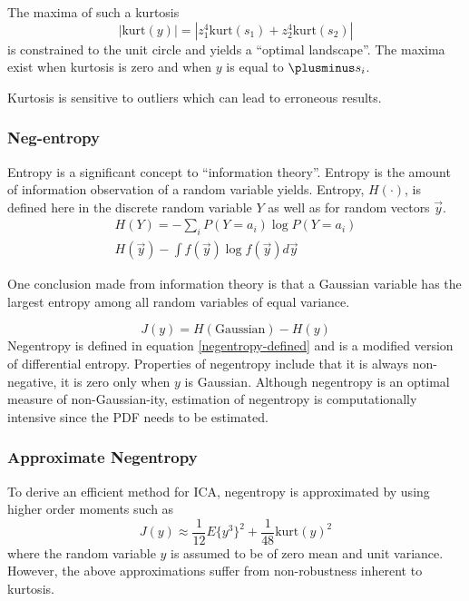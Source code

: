 \documentclass[]{article}
\begin{document}
The maxima of such a kurtosis
\begin{equation}
| \textrm{kurt}(y) | = |z_1 ^4 \textrm{kurt}(s_1) + z_2 ^4 \textrm{kurt}(s_2)|
\end{equation}
is constrained to the unit circle and yields a ``optimal landscape''.  The maxima exist when kurtosis is zero and when $y$ is equal to $\plusminus s_i$.  

Kurtosis is sensitive to outliers which can lead to erroneous results.  


\subsubsection{Neg-entropy}
Entropy is a significant concept to ``information theory''.  Entropy is the amount of information observation of a random variable yields.  Entropy, $H(\cdot)$, is defined here in the discrete random variable $Y$ as well as for random vectors $\vec{y}$.
\begin{eqnarray}
	H(Y) = - \sum _i P(Y = a_i) \log P(Y=a_i) \\
	H(\vec{y}) - \int f(\vec{y}) \log f(\vec{y}) d\vec{y}
\end{eqnarray}

One conclusion made from information theory is that a Gaussian variable has the largest entropy among all random variables of equal variance.  

\begin{equation}
J(y) = H ( \textrm{Gaussian}) - H(y) \label{negentropy-defined}
\end{equation}
Negentropy is defined in equation \ref{negentropy-defined} and   
is a modified version of differential entropy.  Properties of negentropy include that it is always non-negative, it is zero only when $y$ is Gaussian.  Although negentropy is an optimal measure of non-Gaussian-ity, estimation of negentropy is computationally intensive since the PDF needs to be estimated.  


\subsubsection{Approximate Negentropy}

To derive an efficient method for ICA, negentropy is approximated by using higher order moments such as 
\begin{equation}
J(y) \approx \frac{1}{12} E \{ y^3 \}^2 + \frac{1}{48} \textrm{kurt}(y)^2
\end{equation}
where the random variable $y$ is assumed to be of zero mean and unit variance.  However, the above approximations suffer from non-robustness inherent to kurtosis.  
\end{document}
